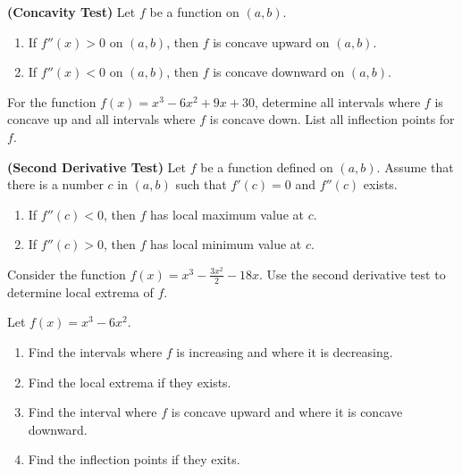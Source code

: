 \begin{proposition}

\textbf{(Concavity Test)} Let \(f\) be a function on \((a, b)\).

\begin{enumerate}[sepno]
\item
  If \(f''(x)>0\) on \((a, b)\), then \(f\) is concave upward on
  \((a, b)\).
\item
  If \(f''(x)<0\) on \((a, b)\), then \(f\) is concave downward on
  \((a, b)\).
\end{enumerate}

\end{proposition}

\begin{example}

For the function \(f(x)=x^3 - 6x^2+9x+30\), determine all intervals where
\(f\) is concave up and all intervals where \(f\) is concave down. List
all inflection points for \(f\).

\end{example}
\vspace*{6\baselineskip}

\begin{proposition}

\textbf{(Second Derivative Test)} Let \(f\) be a function defined on
\((a, b)\). Assume that there is a number \(c\) in \((a, b)\) such that
\(f'(c)=0\) and \(f''(c)\) exists.

\begin{enumerate}[sepno]
\item
  If \(f''(c)<0\), then \(f\) has local maximum value at \(c\).
\item
  If \(f''(c)>0\), then \(f\) has local minimum value at \(c\).
\end{enumerate}

\end{proposition}

\begin{example}

Consider the function \(f(x)=x^3 - \frac{3x^2}{2} - 18x\). Use the second
derivative test to determine local extrema of \(f\).

\end{example}
\vspace*{6\baselineskip}

\begin{example}

Let \(f(x)=x^3-6x^2\).

\begin{enumerate}
\item
  Find the intervals where \(f\) is increasing and where it is
  decreasing.
\item
  Find the local extrema if they exists.
\item
  Find the interval where \(f\) is concave upward and where it is
  concave downward.
\item
  Find the inflection points if they exits.
\end{enumerate}

\end{example}

